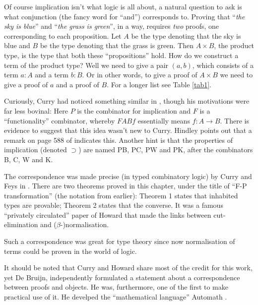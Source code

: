 Of course implication isn't what logic is all about, a natural question to ask is what conjunction (the fancy word for ``and'') corresponds to. Proving that ``\emph{the sky is blue}'' and ``\emph{the grass is green}'', in a way, requires \emph{two} proofs, one corresponding to each proposition. Let $A$ be the type denoting that the sky is blue and $B$ be the type denoting that the grass is green. Then $A \times B$, the product type, is the type that both these ``propositions'' hold. How do we construct a term of the product type? Well we need to give a pair $(a, b)$, which consists of a term $a : A$ and a term $b : B$. Or in other words, to give a proof of $A \times B$ we need to give a proof of $a$ and a proof of $B$. For a longer list see Table \ref{tab1}.

Curiously, Curry had noticed something similar in \cite[footnote 28]{10.2307/2266302}, though his motivations were far less bovinal: 
Here $P$ is the combinator for implication and $F$ is a ``functionality'' combinator, whereby $F A B f$ essentially means $f : A \to B$.
There is evidence to suggest that this idea wasn't new to Curry. Hindley \cite{hindley_1997} points out that a remark on page 588 of \cite{10.2307/86796} indicates this. Another hint is that the properties of implication (denoted $\supset$) are named PB, PC, PW and PK, after the combinators B, C, W and K.

The correspondence was made precise (in typed combinatory logic) by Curry and Feys in \cite[Chapter 9]{curry1958combinatory}. There are two theorems proved in this chapter, under the title of ``F-P transformation'' (the notation from earlier): Theorem 1 states that inhabited types are provable; Theorem 2 states that the converse. It was a famous ``privately circulated'' paper of Howard \cite{howard1980formulae} that made the links between cut-elimination and ($\beta$-)normalisation.

Such a correspondence was great for type theory since now normalisation of terms could be proven in the world of logic.

It should be noted that Curry and Howard share most of the credit for this work, yet De Bruijn, independently formulated a statement about a correspondence between proofs and objects. He was, furthermore, one of the first to make practical use of it. He develped the ``mathematical language'' Automath \cite{DEBRUIJN1994141}. 

